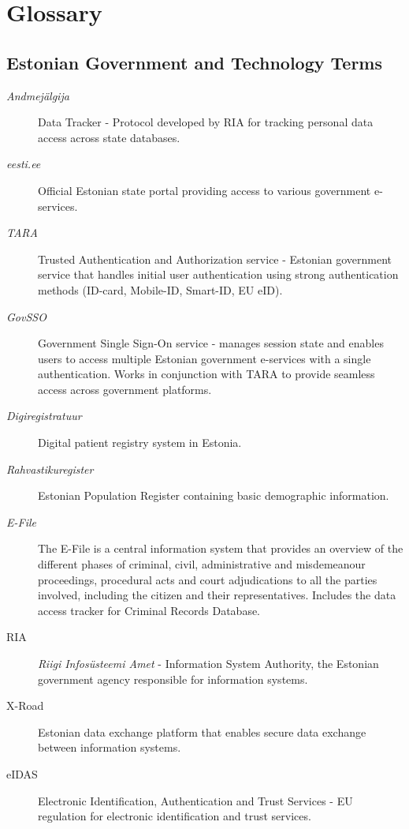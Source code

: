 \section{Glossary}

\subsection{Estonian Government and Technology Terms}

\begin{description}
    \item[\textit{Andmejälgija}] Data Tracker - Protocol developed by RIA for tracking personal data access across state databases.
    
    \item[\textit{eesti.ee}] Official Estonian state portal providing access to various government e-services.
    
    \item[\textit{TARA}] Trusted Authentication and Authorization service - Estonian government service that handles initial user authentication using strong authentication methods (ID-card, Mobile-ID, Smart-ID, EU eID).
    
    \item[\textit{GovSSO}] Government Single Sign-On service - manages session state and enables users to access multiple Estonian government e-services with a single authentication. Works in conjunction with TARA to provide seamless access across government platforms.
    
    \item[\textit{Digiregistratuur}] Digital patient registry system in Estonia.
    
    \item[\textit{Rahvastikuregister}] Estonian Population Register containing basic demographic information.
    
    \item[\textit{E-File}] The E-File is a central information system that provides an overview of the different phases of criminal, civil, administrative and misdemeanour proceedings, procedural acts and court adjudications to all the parties involved, including the citizen and their representatives\cite{e-file-rik}. Includes the data access tracker for Criminal Records Database. 
    
    \item[RIA] \textit{Riigi Infosüsteemi Amet} - Information System Authority, the Estonian government agency responsible for information systems.
    
    \item[X-Road] Estonian data exchange platform that enables secure data exchange between information systems.
    
    \item[eIDAS] Electronic Identification, Authentication and Trust Services - EU regulation for electronic identification and trust services.
\end{description}

